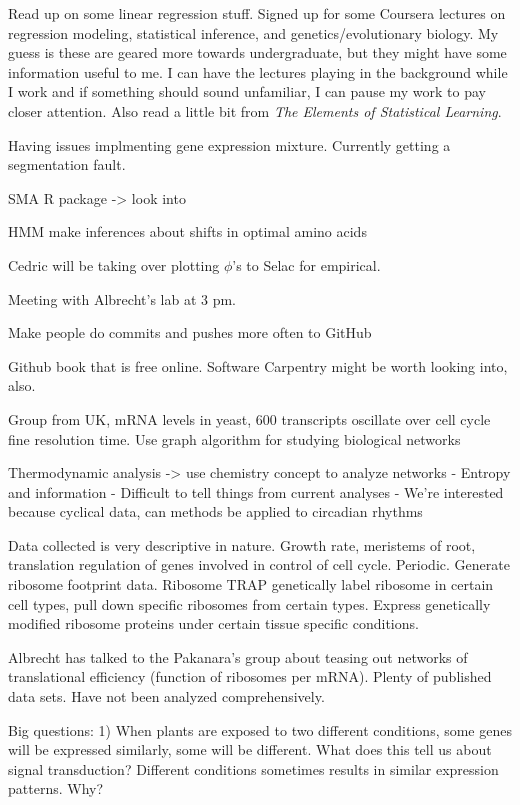 \documentclass[11pt]{labbook}
\begin{document}
Read up on some linear regression stuff. Signed up for some Coursera lectures on regression modeling, statistical inference, and genetics/evolutionary biology. My guess is these are geared more towards undergraduate, but they might have some information useful to me. I can have the lectures playing in the background while I work and if something should sound unfamiliar, I can pause my work to pay closer attention. Also read a little bit from \textit{The Elements of Statistical Learning}.

Having issues implmenting gene expression mixture. Currently getting a segmentation fault. 


SMA R package -> look into

HMM make inferences about shifts in optimal amino acids

Cedric will be taking over plotting $\phi$'s to Selac for empirical.

Meeting with Albrecht's lab at 3 pm. 

Make people do commits and pushes more often to GitHub

Github book that is free online. Software Carpentry might be worth looking into, also.

Group from UK, mRNA levels in yeast, 600 transcripts oscillate over cell cycle fine resolution time. Use graph algorithm for studying biological networks

Thermodynamic analysis -> use chemistry concept to analyze networks
	- Entropy and information
	- Difficult to tell things from current analyses
	- We're interested because cyclical data, can methods be applied to 			  circadian rhythms
	 

Data collected is very descriptive in nature. Growth rate, meristems of root, translation regulation of genes involved in control of cell cycle. Periodic. Generate ribosome footprint data. Ribosome TRAP genetically label ribosome in certain cell types, pull down specific ribosomes from certain types. Express genetically modified ribosome proteins under certain tissue specific conditions.  

Albrecht has talked to the Pakanara's group about teasing out networks of translational efficiency (function of ribosomes per mRNA). Plenty of published data sets. Have not been analyzed comprehensively. 

Big questions:
1) When plants are exposed to two different conditions, some genes will be expressed similarly, some will be different. What does this tell us about signal transduction? Different conditions sometimes results in similar expression patterns. Why? 
\end{document}
